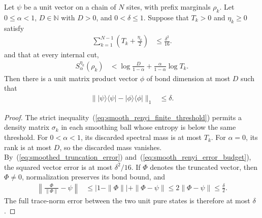 \begin{lemma}
    \label{thm:smooth_renyi_finite_criterion}
    \leanok
    Let $\psi$ be a unit vector on a chain of $N$ sites, with prefix marginals
    $\rho_k$. Let $0\le\alpha<1$, $D\in\mathbb N$ with $D>0$, and
    $0<\delta\le1$. Suppose that $T_k>0$ and $\eta_k\ge0$ satisfy
    \begin{align}
        \sum_{k=1}^{N-1}\left(T_k+\frac{\eta_k}{2}\right) & \le
        \frac{\delta^2}{16}.
        \label{eq:smooth_renyi_error_budget}
    \end{align}
    and that at every internal cut,
    \begin{align}
        S_\alpha^{\eta_k}(\rho_k) & <\log\frac{D}{1-\alpha}
        +\frac{\alpha}{1-\alpha}\log T_k.
        \label{eq:smooth_renyi_finite_threshold}
    \end{align}
    Then there is a unit matrix product vector $\phi$ of bond dimension at
    most $D$ such that
    \begin{align}
        \bigl\||\psi\rangle\langle\psi|
        -|\phi\rangle\langle\phi|\bigr\|_1 & \le\delta.
        \label{eq:smooth_renyi_trace_error}
    \end{align}
\end{lemma}
\begin{proof}
    \leanok
    The strict inequality~(\ref{eq:smooth_renyi_finite_threshold}) permits a density matrix $\sigma_k$ in each
    smoothing ball whose entropy is below the same threshold. For
    $0<\alpha<1$, its discarded spectral mass is at most $T_k$. For
    $\alpha=0$, its rank is at most $D$, so the discarded mass vanishes.
    By~(\ref{eq:smoothed_truncation_error}) and~(\ref{eq:smooth_renyi_error_budget}), the squared vector error is at most
    $\delta^2/16$. If $\Phi$ denotes the truncated vector, then $\Phi\ne0$,
    normalization preserves its bond bound, and
    \begin{align}
        \left\|\frac{\Phi}{\|\Phi\|}-\psi\right\|
         & \le |1-\|\Phi\||+\|\Phi-\psi\|
        \le 2\|\Phi-\psi\|\le\frac{\delta}{2}.
        \label{eq:smooth_renyi_normalized_vector_error}
    \end{align}
    The full trace-norm error
    between the two unit pure states is therefore at most $\delta$.
\end{proof}

